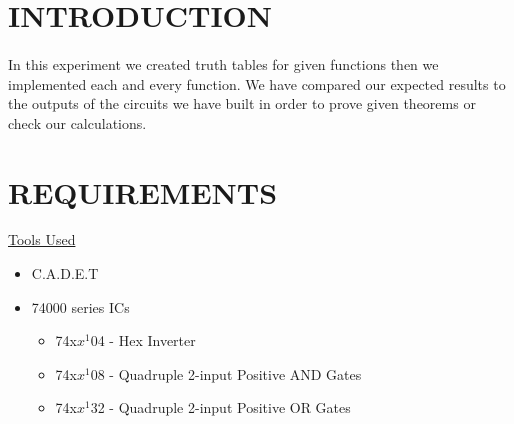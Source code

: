 \documentclass[pdftex,12pt,a4paper]{article}
\begin{document}

\setcounter{page}{1}
\section{INTRODUCTION }
\begin{flushleft}
\paragraph{} 
In this experiment we created truth tables for given functions then we implemented each and every function. We have compared our expected results to the outputs of the circuits we have built in order to prove given theorems or check our calculations.
\end{flushleft}
  

\section{REQUIREMENTS}

\begin{flushleft}
\underline{Tools Used}\cite{booklet}
\end{flushleft}
\begin{itemize}
    \item C.A.D.E.T
    \item 74000 series ICs
    \begin{itemize}
        \item 74x$x^{1}$04 - Hex Inverter
        \item 74x$x^{1}$08 - Quadruple 2-input Positive AND Gates
        \item 74x$x^{1}$32 - Quadruple 2-input Positive OR Gates
    \end{itemize}
\end{itemize}
\end{document}
